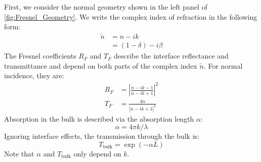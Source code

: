 First, we consider the normal geometry shown in the left panel of \cref{fig:Fresnel_Geometry}. We write the complex index of refraction in the following form:
\begin{equation}
	\begin{aligned}
		\tilde{n} &= n - i k \\
		&= (1-\delta) - i \beta
	\end{aligned}
	\label{eqn:complex_index}
\end{equation}
The Fresnel coefficients $R_F$ and $T_F$ describe the interface reflectance and transmittance and depend on both parts of the complex index $\tilde{n}$. For normal incidence, they are:
\begin{equation}
	\begin{aligned}
		R_F &= \left| \frac{n-ik-1}{n-ik+1}   \right|^2 \\
		T_F &=  \frac{4n}{\left|n-ik+1\right|^2}
	\end{aligned}
	\label{eqn:fresnel_normal}
\end{equation}
Absorption in the bulk is described via the absorption length $\alpha$:
\begin{equation}
	\alpha = 4 \pi k / \lambda
\end{equation}
Ignoring interface effects, the transmission through the bulk is:
\begin{equation}
	T_{\text{bulk}} = \exp( - \alpha L)
\end{equation}
Note that $\alpha$ and $T_{\text{bulk}}$ only depend on $k$.

